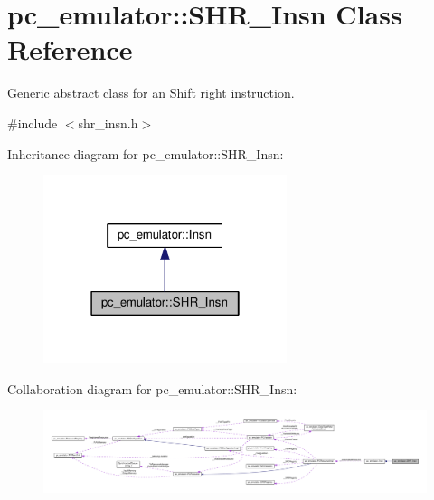 \hypertarget{classpc__emulator_1_1SHR__Insn}{}\section{pc\+\_\+emulator\+:\+:S\+H\+R\+\_\+\+Insn Class Reference}
\label{classpc__emulator_1_1SHR__Insn}


Generic abstract class for an Shift right instruction.  




{\ttfamily \#include $<$shr\+\_\+insn.\+h$>$}



Inheritance diagram for pc\+\_\+emulator\+:\+:S\+H\+R\+\_\+\+Insn\+:\nopagebreak
\begin{figure}[H]
\begin{center}
\leavevmode
\includegraphics[width=202pt]{classpc__emulator_1_1SHR__Insn__inherit__graph}
\end{center}
\end{figure}


Collaboration diagram for pc\+\_\+emulator\+:\+:S\+H\+R\+\_\+\+Insn\+:\nopagebreak
\begin{figure}[H]
\begin{center}
\leavevmode
\includegraphics[width=350pt]{classpc__emulator_1_1SHR__Insn__coll__graph}
\end{center}
\end{figure}
